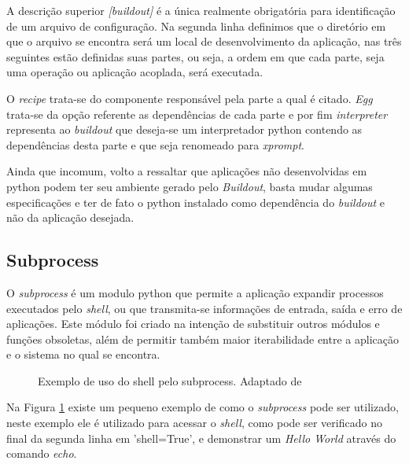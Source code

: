 A descrição superior \textit{[buildout]} é a única realmente obrigatória para identificação de um arquivo de configuração. Na segunda linha definimos que o diretório em que o arquivo se encontra será um local de desenvolvimento da aplicação, nas três seguintes estão definidas suas partes, ou seja, a ordem em que cada parte, seja uma operação ou aplicação acoplada, será executada.

O \textit{recipe} trata-se do componente responsável pela parte a qual é citado. \textit{Egg} trata-se da opção referente as dependências de cada parte e por fim \textit{interpreter} representa ao \textit{buildout} que deseja-se um interpretador python contendo as dependências desta parte e que seja renomeado para \textit{xprompt}.


Ainda que incomum, volto a ressaltar que aplicações não desenvolvidas em python podem ter seu ambiente gerado pelo \textit{Buildout}, basta mudar algumas especificações e ter de fato o python instalado como dependência do \textit{buildout} e não da aplicação desejada.

\subsection{Subprocess}

O \textit{subprocess} é um modulo python que permite a aplicação expandir processos executados pelo \textit{shell}, ou que transmita-se informações de entrada, saída e erro de aplicações. Este módulo foi criado na intenção de substituir outros módulos e funções obsoletas, além de permitir também maior iterabilidade entre a aplicação e o sistema no qual se encontra.

\begin{figure}[ht]
    \centering
    \caption{Exemplo de uso do shell pelo subprocess. Adaptado de \cite{GADNER-SUBPROCESS}}
    \label{subprocess}
\end{figure}

Na Figura \ref{subprocess} existe um pequeno exemplo de como o \textit{subprocess} pode ser utilizado, neste exemplo ele é utilizado para acessar o \textit{shell}, como pode ser verificado no final da segunda linha em 'shell=True', e demonstrar um \textit{Hello World} através do comando \textit{echo}.


